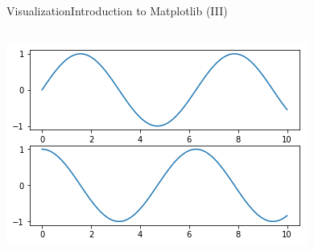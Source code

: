 \documentclass[10pt,compress]{beamer} %
\begin{document}
\begin{frame}[fragile]{Visualization}{Introduction to Matplotlib (III)}
	\begin{columns}
		\includegraphics[width=\textwidth]{figs/api.png}
	\end{columns}
\end{frame}
\end{document}
